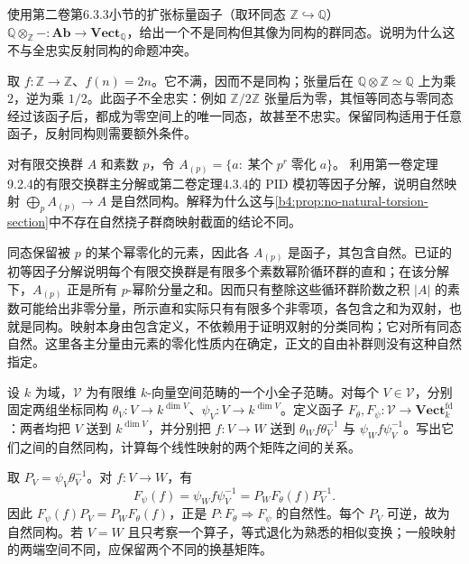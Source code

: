 \begin{exercise}\label{b4:ex:01-rationalization-not-reflect}
	使用第二卷第6.3.3小节的扩张标量函子（取环同态 \(\mathbb Z\hookrightarrow\mathbb Q\)） \(\mathbb Q\otimes_{\mathbb Z}-:\mathbf{Ab}\rightarrow\mathbf{Vect}_{\mathbb Q}\)，给出一个不是同构但其像为同构的群同态。说明为什么这不与全忠实反射同构的命题冲突。
\end{exercise}
\begin{solution}
	取 \(f:\mathbb Z\rightarrow\mathbb Z\)、\(f(n)=2n\)。它不满，因而不是同构；张量后在 \(\mathbb Q\otimes\mathbb Z\simeq\mathbb Q\) 上为乘 \(2\)，逆为乘 \(1/2\)。此函子不全忠实：例如 \(\mathbb Z/2\mathbb Z\) 张量后为零，其恒等同态与零同态经过该函子后，都成为零空间上的唯一同态，故甚至不忠实。保留同构适用于任意函子，反射同构则需要额外条件。
\end{solution}

\begin{exercise}\label{b4:ex:01-primary-decomposition-natural}
	对有限交换群 \(A\) 和素数 \(p\)，令 \(A_{(p)}=\{a:\;\text{某个}\;p^r\;\text{零化}\;a\}\)。
	利用第一卷定理9.2.4的有限交换群主分解或第二卷定理4.3.4的 PID 模初等因子分解，说明自然映射 \(\bigoplus_pA_{(p)}\rightarrow A\) 是自然同构。解释为什么这与\cref{b4:prop:no-natural-torsion-section}中不存在自然挠子群商映射截面的结论不同。
\end{exercise}
\begin{solution}
	同态保留被 \(p\) 的某个幂零化的元素，因此各 \(A_{(p)}\) 是函子，其包含自然。已证的初等因子分解说明每个有限交换群是有限多个素数幂阶循环群的直和；在该分解下，\(A_{(p)}\) 正是所有 \(p\)-幂阶分量之和。因而只有整除这些循环群阶数之积 \(|A|\) 的素数可能给出非零分量，所示直和实际只有有限多个非零项，各包含之和为双射，也就是同构。映射本身由包含定义，不依赖用于证明双射的分类同构；它对所有同态自然。这里各主分量由元素的零化性质内在确定，正文的自由补群则没有这种自然指定。
\end{solution}

\begin{exercise}\label{b4:ex:01-two-coordinate-functors}
	设 \(k\) 为域，\(\mathcal V\) 为有限维 \(k\)-向量空间范畴的一个小全子范畴。对每个 \(V\in\mathcal V\)，分别固定两组坐标同构 \(\theta_V:V\rightarrow k^{\dim V}\)、\(\psi_V:V\rightarrow k^{\dim V}\)。定义函子 \(F_\theta,F_\psi:\mathcal V\to\mathbf{Vect}_k^{\mathrm{fd}}\)：两者均把 \(V\) 送到 \(k^{\dim V}\)，并分别把 \(f:V\to W\) 送到 \(\theta_Wf\theta_V^{-1}\) 与 \(\psi_Wf\psi_V^{-1}\)。写出它们之间的自然同构，计算每个线性映射的两个矩阵之间的关系。
\end{exercise}
\begin{solution}
	取 \(P_V=\psi_V\theta_V^{-1}\)。对 \(f:V\rightarrow W\)，有
	\[
		F_\psi(f)=\psi_Wf\psi_V^{-1} =P_WF_\theta(f)P_V^{-1}.
	\]
	因此 \(F_\psi(f)P_V=P_WF_\theta(f)\)，正是 \(P:F_\theta\Rightarrow F_\psi\) 的自然性。每个 \(P_V\) 可逆，故为自然同构。若 \(V=W\) 且只考察一个算子，等式退化为熟悉的相似变换；一般映射的两端空间不同，应保留两个不同的换基矩阵。
\end{solution}

